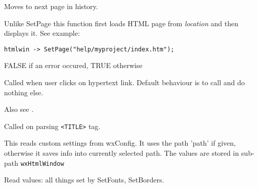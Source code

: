 
Moves to next page in history.

\label{wxhtmlwindowloadpage}


Unlike SetPage this function first loads HTML page from {\it location} 
and then displays it. See example:

\begin{verbatim}
htmlwin -> SetPage("help/myproject/index.htm");
\end{verbatim}




FALSE if an error occured, TRUE otherwise

\label{wxhtmlwindowonlinkclicked}


Called when user clicks on hypertext link. Default behaviour is to call 
 and do nothing else.

Also see .


\label{wxhtmlwindowonsettitle}


Called on parsing {\tt <TITLE>} tag.


\label{wxhtmlwindowreadcustomization}


This reads custom settings from wxConfig. It uses the path 'path'
if given, otherwise it saves info into currently selected path.
The values are stored in sub-path {\tt wxHtmlWindow}

Read values: all things set by SetFonts, SetBorders.



